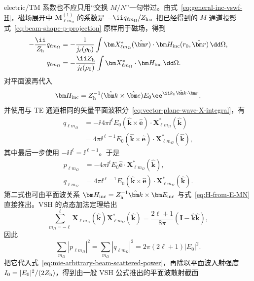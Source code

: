 electric/TM 系数也不应只用“交换 $M/N$”一句带过。由式~\eqref{eq:general-inc-vswf-H}，磁场展开中 $\bm M_{\ell m_\Omega}^{(1)}$ 的系数是 $-\ii q_{\ell m_\Omega}/Z_{\rm h}$。把已经得到的 $M$ 通道投影式~\eqref{eq:beam-shape-p-projection} 原样用于磁场，得到
\begin{align}
-\frac{\ii}{Z_{\rm h}}q_{\ell m_\Omega}
&=-\frac{1}{j_\ell(\rho_0)}
\int \bm X_{\ell m_\Omega}^*(\hat{\bm r})
\cdot\bm H_{\rm inc}(r_0,\hat{\bm r})\,\dd\Omega,\\
q_{\ell m_\Omega}
&=-\frac{\ii Z_{\rm h}}{j_\ell(\rho_0)}
\int \bm X_{\ell m_\Omega}^*\cdot\bm H_{\rm inc}\,\dd\Omega.
\label{eq:q-from-H-projection}
\end{align}
对平面波再代入
\begin{equation}
\bm H_{\rm inc}=Z_{\rm h}^{-1}
(\hat{\bm k}\times\hat{\bm e})E_0
\ee^{\ii k_{\rm h}\hat{\bm k}\cdot\bm r},
\end{equation}
并使用与 TE 通道相同的矢量平面波积分~\eqref{eq:vector-plane-wave-X-integral}，有
\begin{align}
q_{\ell m_\Omega}
&=-\ii\,4\pi\ii^\ell E_0
(\hat{\bm k}\times\hat{\bm e})\cdot
\bm X_{\ell m_\Omega}^*(\hat{\bm k})\\
&=4\pi\ii^{\ell-1}E_0
(\hat{\bm k}\times\hat{\bm e})\cdot
\bm X_{\ell m_\Omega}^*(\hat{\bm k}),
\end{align}
其中最后一步使用 $-\ii\,\ii^\ell=\ii^{\ell-1}$。于是
\begin{align}
p_{\ell m_{\Omega}}
&=-4\pi\ii^\ell E_0
\hat{\bm e}\cdot
\bm X_{\ell m_{\Omega}}^*(\hat{\bm k}),
\\
q_{\ell m_{\Omega}}
&=4\pi\ii^{\ell-1}E_0
(\hat{\bm k}\times\hat{\bm e})\cdot
\bm X_{\ell m_{\Omega}}^*(\hat{\bm k}).
\label{eq:plane-wave-beam-shape-coefficients}
\end{align}
第二式也可由平面波关系
$\bm H_{\rm inc}=Z_{\rm h}^{-1}\hat{\bm k}\times\bm E_{\rm inc}$
与式~\eqref{eq:H-from-E-MN} 直接推出。VSH 的点态加法定理给出
\begin{equation}
\sum_{m_{\Omega}=-\ell}^{\ell}
\bm X_{\ell m_{\Omega}}(\hat{\bm k})
\bm X_{\ell m_{\Omega}}^*(\hat{\bm k})
=\frac{2\ell+1}{8\pi}
(\mathbf I-\hat{\bm k}\hat{\bm k}),
\end{equation}
因此
\begin{equation}
\sum_{m_{\Omega}}|p_{\ell m_{\Omega}}|^2
=\sum_{m_{\Omega}}|q_{\ell m_{\Omega}}|^2
=2\pi(2\ell+1)|E_0|^2.
\end{equation}
把它代入式~\eqref{eq:mie-arbitrary-beam-scattered-power}，再除以平面波入射强度
$I_0=|E_0|^2/(2Z_{\rm h})$，得到由一般 VSH 公式推出的平面波散射截面
